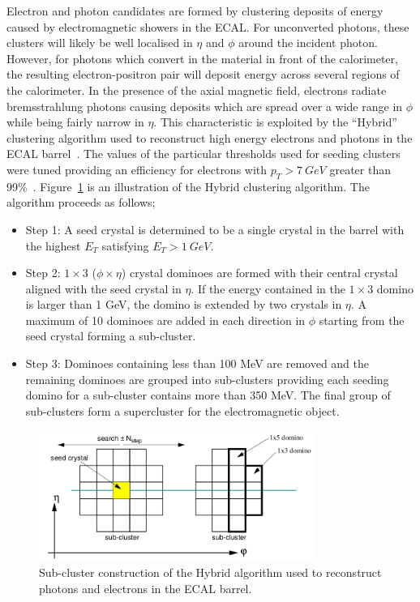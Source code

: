 Electron and photon candidates are formed by clustering deposits of 
energy caused by electromagnetic showers in the ECAL. For unconverted 
photons, these clusters will likely be well localised in $\eta$ and $\phi$
around the incident photon. However, for photons which convert in the material in front of the 
calorimeter, the resulting electron-positron pair will deposit energy across several regions
of the calorimeter. In the presence of the axial magnetic field, 
electrons radiate bremsstrahlung photons causing deposits which are 
spread over a wide range in $\phi$ while being fairly narrow in $\eta$.
This characteristic is exploited by the ``Hybrid'' clustering algorithm 
used to reconstruct high energy electrons and photons in
the ECAL barrel~\citep{cseez}. 
The values of the particular thresholds used for seeding clusters were tuned providing
an efficiency for electrons with $p_{T}>7~GeV$ greater than 99\%~\citep{dfutyan}.
Figure~\ref{fig:hybridclustering} is an illustration of the Hybrid clustering algorithm.
The algorithm proceeds as follows;
\begin{itemize}
 \item Step 1: A seed crystal is determined to be a single crystal in the barrel with the highest
 $E_{T}$ satisfying $E_{T}>1~GeV$.
 \item Step 2: $1\times3$ ($\phi\times\eta$) crystal dominoes are formed with their central crystal 
 aligned with the seed crystal in $\eta$. If the energy contained in the $1\times3$ domino is 
 larger than 1 GeV, the domino is extended by two crystals in $\eta$. A maximum of 10 dominoes are 
 added in each direction in $\phi$ starting from the seed crystal forming a sub-cluster.
 \item Step 3: Dominoes containing less than 100 MeV are removed and the remaining dominoes are 
 grouped into sub-clusters providing each seeding domino for a sub-cluster contains more than 350 MeV. 
 The final group of sub-clusters form a supercluster for the electromagnetic object.
\end{itemize}

\begin{figure}
\begin{center}
	\includegraphics[width=0.8\textwidth]{detector/ecal/clustering.png}
	\caption{Sub-cluster construction of the Hybrid algorithm used to reconstruct photons and 
	electrons in the ECAL barrel.}
	\label{fig:hybridclustering}
\end{center}
\end{figure}

